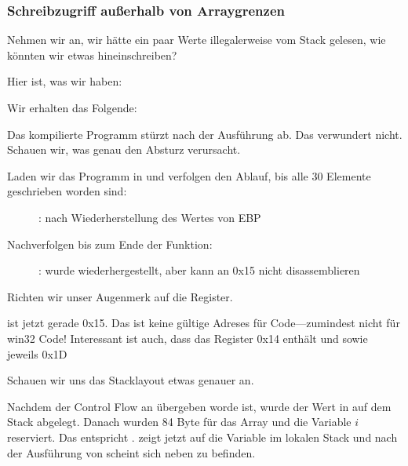 \subsubsection{Schreibzugriff außerhalb von Arraygrenzen}
Nehmen wir an, wir hätte ein paar Werte illegalerweise vom Stack gelesen, wie könnten wir etwas hineinschreiben?

Hier ist, was wir haben:




Wir erhalten das Folgende:


Das kompilierte Programm stürzt nach der Ausführung ab. Das verwundert nicht. Schauen wir, was genau den Absturz
verursacht.

\clearpage
\myindex{\olly}
Laden wir das Programm in \olly und verfolgen den Ablauf, bis alle 30 Elemente geschrieben worden sind:

\begin{figure}[H]
\centering
{}
\caption{\olly: nach Wiederherstellung des Wertes von EBP}
\label{fig:array_BO_olly_w1}
\end{figure}

\clearpage
Nachverfolgen bis zum Ende der Funktion:

\begin{figure}[H]
\centering
{}
\caption{\olly: 
 wurde wiederhergestellt, aber \olly kann an 0x15 nicht disassemblieren}
\label{fig:array_BO_olly_w2}
\end{figure}
Richten wir unser Augenmerk auf die Register.

\EIP ist jetzt gerade 0x15. Das ist keine gültige Adreses für Code---zumindest nicht für win32 Code!
Interessant ist auch, dass das \EBP Register 0x14 enthält und \ECX sowie \EDX jeweils 0x1D

Schauen wir uns das Stacklayout etwas genauer an.

Nachdem der Control Flow an \TT{\main} übergeben worde ist, wurde der Wert in \EBP auf dem Stack abgelegt.
Danach wurden 84 Byte für das Array und die Variable $i$ reserviert.
Das entspricht .
\ESP zeigt jetzt auf die Variable  im lokalen Stack und nach der Ausführung von  scheint sich
 neben  zu befinden.

